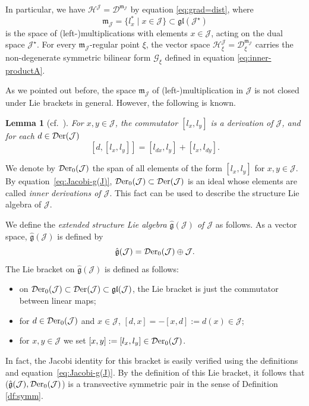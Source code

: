 \documentclass[pdftex]{sigma}
\numberwithin{equation}{section}
\newtheorem{Lemma}[Theorem]{Lemma}
\newcommand{\be}{\begin{equation}}
\newcommand{\ee}{\end{equation}}
\newcommand{\hh}{\mathcal{H}}
\newcommand{\Der}{\mathcal{D}{\rm er}}
\newcommand{\dcal}{\mathcal{D}}
\newcommand{\Jcal}{\mathcal{J}}
\newcommand{\m}{\mathfrak{m}}
\newcommand{\g}{{\mathfrak{g}}}
\renewcommand{\m}{{\mathfrak m}}
\newcommand{\gl}{{\mathfrak{gl}}}
\newcommand{\Gcal}{\mathcal{G}}
\begin{document}
In particular, we have $\hh^\Jcal = \dcal^{\m_\Jcal}$ by equation \eqref{eq:grad=dist}, where
\[
\m_\Jcal = \{l_x^\ast \mid x \in \Jcal\} \subset \gl(\Jcal^\star)
\]
is the space of (left-)multiplications with elements $x \in \Jcal$, acting on the dual space $\Jcal^\star$.
For every $\m_\Jcal$-regular point $\xi$, the vector space $\hh^\Jcal_\xi = \dcal^{\m_\Jcal}_\xi$ carries the non-degenerate symmetric bilinear form $\Gcal_\xi$ defined in equation \eqref{eq:inner-productA}.

As we pointed out before, the space $\m_\Jcal$ of (left-)multiplication in $\Jcal$ is not closed under Lie brackets in general.
However, the following is known.

\begin{Lemma}[{cf.\ \cite[Lemma IV.7]{Koecher-1999}}] \label{structure Lie algebra}
 For $x, y \in \Jcal$, the commutator $[l_x, l_y]$ is a derivation of $\Jcal$, and for each $d \in \Der(\Jcal)$
\be \label{eq:Jacobi-g(J)} [d, [l_x, l_y]] = [l_{dx}, l_y] + [l_x, l_{dy}].
\ee
\end{Lemma}

We denote by $\Der_0(\Jcal)$ the span of all elements of the form $[l_x, l_y]$ for $x,y \in \Jcal$.
By equation~\eqref{eq:Jacobi-g(J)}, $\Der_0(\Jcal) \subset \Der(\Jcal)$ is an ideal whose elements are called {\em inner derivations of $\Jcal$}.
This fact can be used to describe the structure Lie algebra of $\Jcal$.

\begin{Definition}\label{prop: structure of the Lie algebra of the structure group}
We define the {\em extended structure Lie algebra $\hat \g(\Jcal)$ of $\Jcal$ }as follows.
As a vector space, $\hat \g(\Jcal)$ is defined by
\[%
\hat \g(\Jcal) = \Der_0(\Jcal) \oplus \Jcal.
\]
The Lie bracket on $\hat \g(\Jcal)$ is defined as follows:
\begin{itemize}\itemsep=0pt
\item on $\Der_0(\Jcal) \subset \Der(\Jcal) \subset \gl(\Jcal)$, the Lie bracket is just the commutator between linear maps;
\item for $d \in \Der_0(\Jcal)$ and $x \in \Jcal$, $[d, x] = - [x, d] := d(x) \in \Jcal$;
\item for $x,y \in \Jcal$ we set $[x,y] := [l_x, l_y] \in \Der_0(\Jcal)$.
\end{itemize}
\end{Definition}

In fact, the Jacobi identity for this bracket is easily verified using the definitions and equation~\eqref{eq:Jacobi-g(J)}.
By the definition of this Lie bracket, it follows that ($\hat \g(\Jcal),\Der_0(\Jcal) $) is a transvective symmetric pair in the sense of Definition \ref{df:symm}.
\end{document}
